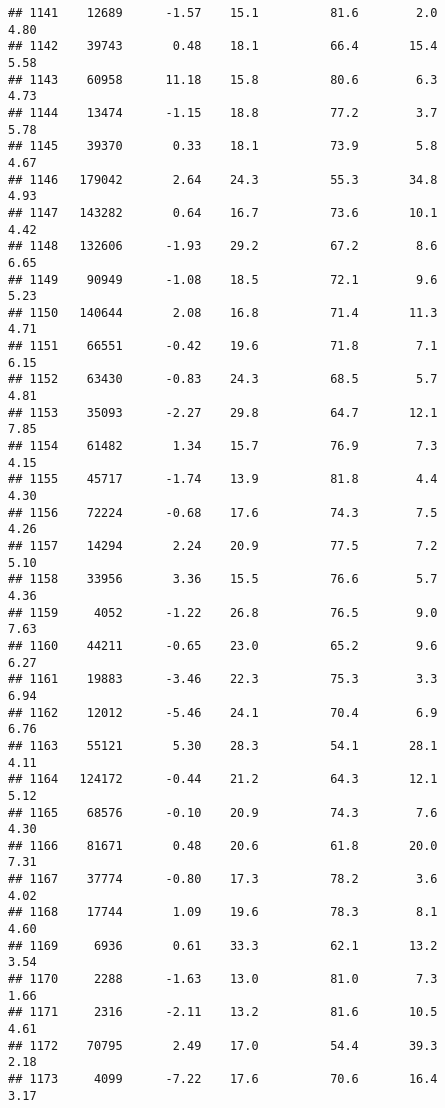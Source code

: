 \documentclass[
]{article}
\begin{document}
\begin{verbatim}
## 1141    12689      -1.57    15.1          81.6        2.0              4.80
## 1142    39743       0.48    18.1          66.4       15.4              5.58
## 1143    60958      11.18    15.8          80.6        6.3              4.73
## 1144    13474      -1.15    18.8          77.2        3.7              5.78
## 1145    39370       0.33    18.1          73.9        5.8              4.67
## 1146   179042       2.64    24.3          55.3       34.8              4.93
## 1147   143282       0.64    16.7          73.6       10.1              4.42
## 1148   132606      -1.93    29.2          67.2        8.6              6.65
## 1149    90949      -1.08    18.5          72.1        9.6              5.23
## 1150   140644       2.08    16.8          71.4       11.3              4.71
## 1151    66551      -0.42    19.6          71.8        7.1              6.15
## 1152    63430      -0.83    24.3          68.5        5.7              4.81
## 1153    35093      -2.27    29.8          64.7       12.1              7.85
## 1154    61482       1.34    15.7          76.9        7.3              4.15
## 1155    45717      -1.74    13.9          81.8        4.4              4.30
## 1156    72224      -0.68    17.6          74.3        7.5              4.26
## 1157    14294       2.24    20.9          77.5        7.2              5.10
## 1158    33956       3.36    15.5          76.6        5.7              4.36
## 1159     4052      -1.22    26.8          76.5        9.0              7.63
## 1160    44211      -0.65    23.0          65.2        9.6              6.27
## 1161    19883      -3.46    22.3          75.3        3.3              6.94
## 1162    12012      -5.46    24.1          70.4        6.9              6.76
## 1163    55121       5.30    28.3          54.1       28.1              4.11
## 1164   124172      -0.44    21.2          64.3       12.1              5.12
## 1165    68576      -0.10    20.9          74.3        7.6              4.30
## 1166    81671       0.48    20.6          61.8       20.0              7.31
## 1167    37774      -0.80    17.3          78.2        3.6              4.02
## 1168    17744       1.09    19.6          78.3        8.1              4.60
## 1169     6936       0.61    33.3          62.1       13.2              3.54
## 1170     2288      -1.63    13.0          81.0        7.3              1.66
## 1171     2316      -2.11    13.2          81.6       10.5              4.61
## 1172    70795       2.49    17.0          54.4       39.3              2.18
## 1173     4099      -7.22    17.6          70.6       16.4              3.17

\end{verbatim}
\end{document}
